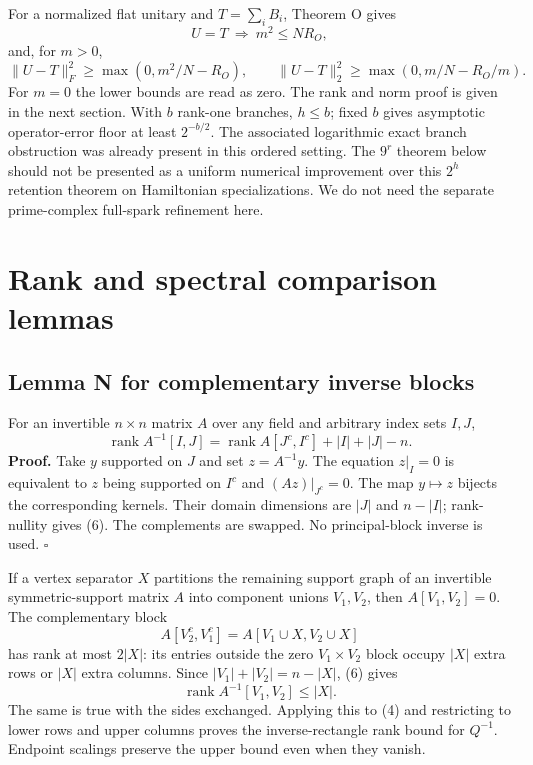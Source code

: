 \documentclass[
  11pt,
]{article}
\begin{document}
For a normalized flat unitary and \(T=\sum_iB_i\), Theorem O gives \[
 U=T\ \Longrightarrow\ m^2\le NR_O,
\] and, for \(m>0\), \[
 \|U-T\|_F^2\ge\max(0,m^2/N-R_O),\qquad
 \|U-T\|_2^2\ge\max(0,m/N-R_O/m).                           \tag{5}
\] For \(m=0\) the lower bounds are read as zero. The rank and norm
proof is given in the next section. With \(b\) rank-one branches,
\(h\le b\); fixed \(b\) gives asymptotic operator-error floor at least
\(2^{-b/2}\). The associated logarithmic exact branch obstruction was
already present in this ordered setting. The \(9^r\) theorem below
should not be presented as a uniform numerical improvement over this
\(2^h\) retention theorem on Hamiltonian specializations. We do not need
the separate prime-complex full-spark refinement here.

\section{Rank and spectral comparison
lemmas}\label{rank-and-spectral-comparison-lemmas}

\subsection{Lemma N for complementary inverse
blocks}\label{lemma-n-for-complementary-inverse-blocks}

For an invertible \(n\times n\) matrix \(A\) over any field and
arbitrary index sets \(I,J\), \[
 \operatorname{rank}A^{-1}[I,J]
 =\operatorname{rank}A[J^c,I^c]+|I|+|J|-n.                 \tag{6}
\] \textbf{Proof.} Take \(y\) supported on \(J\) and set \(z=A^{-1}y\).
The equation \(z|_I=0\) is equivalent to \(z\) being supported on
\(I^c\) and \((Az)|_{J^c}=0\). The map \(y\mapsto z\) bijects the
corresponding kernels. Their domain dimensions are \(|J|\) and
\(n-|I|\); rank-nullity gives (6). The complements are swapped. No
principal-block inverse is used. \(\square\)

If a vertex separator \(X\) partitions the remaining support graph of an
invertible symmetric-support matrix \(A\) into component unions
\(V_1,V_2\), then \(A[V_1,V_2]=0\). The complementary block \[
 A[V_2^c,V_1^c]=A[V_1\cup X,V_2\cup X]
\] has rank at most \(2|X|\): its entries outside the zero
\(V_1\times V_2\) block occupy \(|X|\) extra rows or \(|X|\) extra
columns. Since \(|V_1|+|V_2|=n-|X|\), (6) gives \[
 \operatorname{rank}A^{-1}[V_1,V_2]\le |X|.                \tag{7}
\] The same is true with the sides exchanged. Applying this to (4) and
restricting to lower rows and upper columns proves the inverse-rectangle
rank bound for \(Q^{-1}\). Endpoint scalings preserve the upper bound
even when they vanish.
\end{document}

